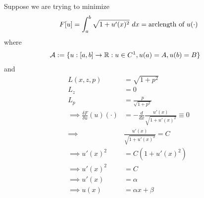 \documentclass{article}
\begin{document}
	\begin{example}
		Suppose we are trying to minimize
		\begin{align}
			F[u] = \int_a^b \sqrt{1 + u'(x)^2}\ dx = \text{{arclength of }} u(\cdot)
		\end{align}
		where 
		\begin{align}
			\mathcal{{A}} &:=\{u:[a, b] \to \mathbb{R}:u \in C^1, u(a) = A, u(b) = B\}
		\end{align}
		and
		\begin{align}
			L(x, z, p) &= \sqrt{1 + p^2} \\
			L_z &= 0 \\
			L_p &= \frac{p}{\sqrt{1+p^2}} \\
			\implies \frac{\delta F}{\delta u}(u)(\cdot) 
			&= - \frac{d}{dx} \frac{u'(x)}{\sqrt{1+u'(x)^2}} \equiv 0 \\
			\implies & \frac{u'(x)}{\sqrt{1+u'(x)^2}} = C \\
			\implies u'(x)^2 &= C (1+u'(x)^2) \\
			\implies u'(x)^2 &= C \\
			\implies u'(x) &= \alpha \\
			\implies u(x) &= \alpha x + \beta
		\end{align}
	\end{example}
	
\end{document}
